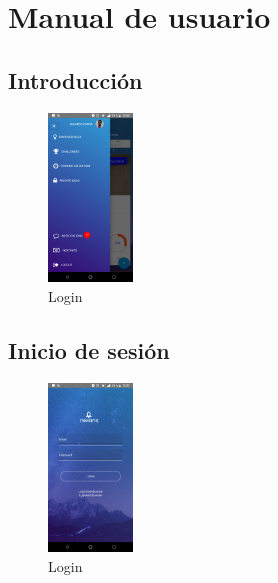 \chapter{Manual de usuario}

\section{Introducción}

\begin{figure}[!h]
	\begin{center}
		\includegraphics[width=0.2\textwidth]{./img/anexo1/menu_admin.png}
		\caption{Login}
		\label{fig:menu_admin}
	\end{center}
\end{figure}

\section{Inicio de sesión}

\begin{figure}[!h]
	\begin{center}
		\includegraphics[width=0.2\textwidth]{./img/anexo1/login.png}
		\caption{Login}
		\label{fig:login}
	\end{center}
\end{figure}

